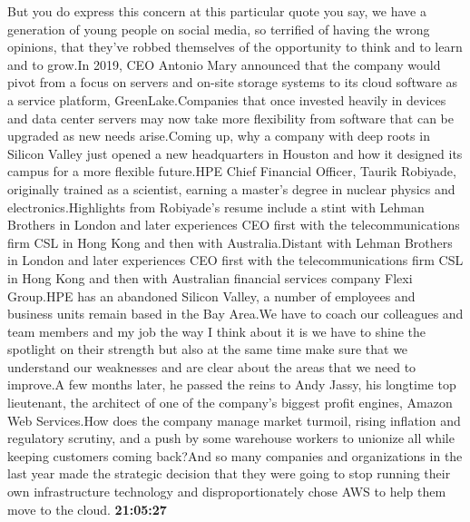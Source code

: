 \documentclass{article}%
\begin{document}
But you do express this concern at this particular quote you say, we have a generation of young people on social media, so terrified of having the wrong opinions, that they've robbed themselves of the opportunity to think and to learn and to grow.In 2019, CEO Antonio Mary announced that the company would pivot from a focus on servers and on{-}site storage systems to its cloud software as a service platform, GreenLake.Companies that once invested heavily in devices and data center servers may now take more flexibility from software that can be upgraded as new needs arise.Coming up, why a company with deep roots in Silicon Valley just opened a new headquarters in Houston and how it designed its campus for a more flexible future.HPE Chief Financial Officer, Taurik Robiyade, originally trained as a scientist, earning a master's degree in nuclear physics and electronics.Highlights from Robiyade's resume include a stint with Lehman Brothers in London and later experiences CEO first with the telecommunications firm CSL in Hong Kong and then with Australia.Distant with Lehman Brothers in London and later experiences CEO first with the telecommunications firm CSL in Hong Kong and then with Australian financial services company Flexi Group.HPE has an abandoned Silicon Valley, a number of employees and business units remain based in the Bay Area.We have to coach our colleagues and team members and my job the way I think about it is we have to shine the spotlight on their strength but also at the same time make sure that we understand our weaknesses and are clear about the areas that we need to improve.A few months later, he passed the reins to Andy Jassy, his longtime top lieutenant, the architect of one of the company's biggest profit engines, Amazon Web Services.How does the company manage market turmoil, rising inflation and regulatory scrutiny, and a push by some warehouse workers to unionize all while keeping customers coming back?And so many companies and organizations in the last year made the strategic decision that they were going to stop running their own infrastructure technology and disproportionately chose AWS to help them move to the cloud.%
\textbf{21:05:27}%
\newline%
\end{document}
